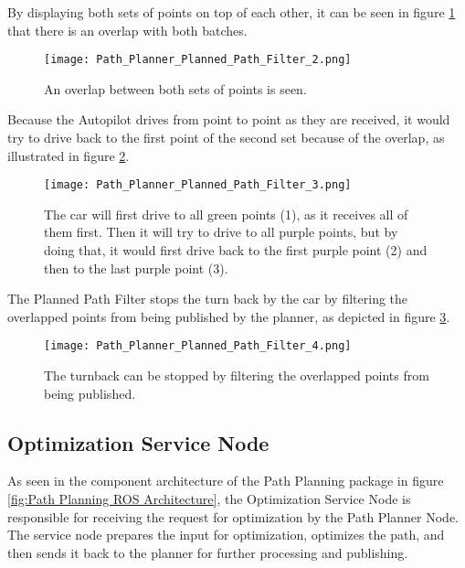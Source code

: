 \pagebreak

By displaying both sets of points on top of each other, it can be seen in figure \ref{fig:Path Planner Planned Path Filter 2} that there is an overlap with both batches.
\begin{figure}[H]
    \centering
    \texttt{[image: Path\_Planner\_Planned\_Path\_Filter\_2.png]}
    \caption{An overlap between both sets of points is seen.}
    \label{fig:Path Planner Planned Path Filter 2}
\end{figure}
Because the Autopilot drives from point to point as they are received, it would try to drive back to the first point of the second set because of the overlap, as illustrated in figure \ref{fig:Path Planner Planned Path Filter 3}.
\begin{figure}[H]
    \centering
    \texttt{[image: Path\_Planner\_Planned\_Path\_Filter\_3.png]}
    \caption{The car will first drive to all green points (1), as it receives all of them first. Then it will try to drive to all purple points, but by doing that, it would first drive back to the first purple point (2) and then to the last purple point (3).}
    \label{fig:Path Planner Planned Path Filter 3}
\end{figure}
The Planned Path Filter stops the turn back by the car by filtering the overlapped points from being published by the planner, as depicted in figure \ref{fig:Path Planner Planned Path Filter 4}.
\begin{figure}[H]
    \centering
    \texttt{[image: Path\_Planner\_Planned\_Path\_Filter\_4.png]}
    \caption{The turnback can be stopped by filtering the overlapped points from being published.}
    \label{fig:Path Planner Planned Path Filter 4}
\end{figure}

\subsection{Optimization Service Node} \label{sec:Optimization Service Node}
As seen in the component architecture of the Path Planning package in figure \ref{fig:Path Planning ROS Architecture}, the Optimization Service Node is responsible for receiving the request for optimization by the Path Planner Node. The service node prepares the input for optimization, optimizes the path, and then sends it back to the planner for further processing and publishing.

